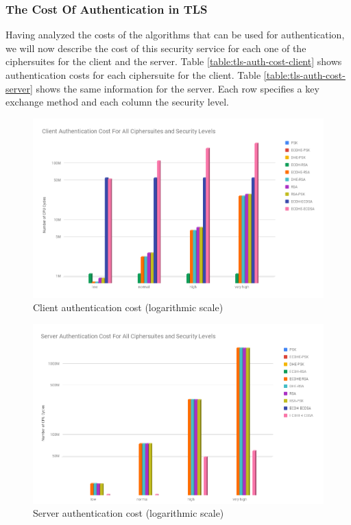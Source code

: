 \subsubsection{The Cost Of Authentication in TLS} \label{sec:auth-cost-in-tls}

Having analyzed the costs of the algorithms that can be used for authentication, we will now describe the cost of this security service
for each one of the ciphersuites for the client and the server. Table \ref{table:tls-auth-cost-client} shows authentication costs for each
ciphersuite for the client. Table \ref{table:tls-auth-cost-server} shows the same information for the server. Each row specifies a key
exchange method and each column the security level.

\begin{figure}
  \centering
  \includegraphics[width=1.0\textwidth]{img/tls-client-auth-cost.png}
  \centering \caption{\label{fig:tls-auth-cost-client} Client authentication cost (logarithmic scale)}
\end{figure}

\begin{figure}
  \centering
  \includegraphics[width=1.0\textwidth]{img/tls-server-auth-cost.png}
  \centering \caption{\label{fig:tls-auth-cost-server} Server authentication cost (logarithmic scale)}
\end{figure}


